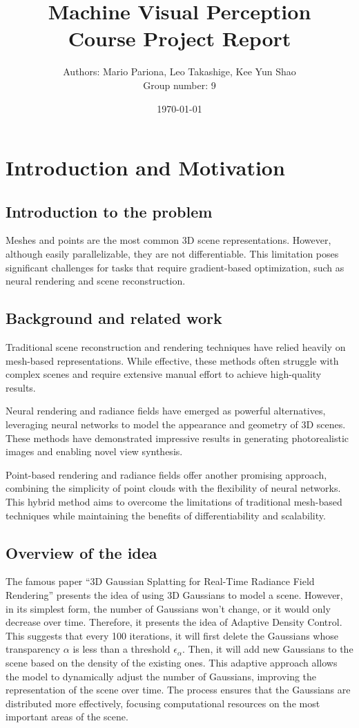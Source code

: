 \documentclass[12pt]{report}
\begin{document}
\title{Machine Visual Perception\\Course Project Report}
\author{Authors: Mario Pariona, Leo Takashige, Kee Yun Shao\\ Group number: 9}
\date{\today}
\maketitle

\chapter{Introduction and Motivation}
\section{Introduction to the problem}
Meshes and points are the most common 3D scene representations. However, although easily parallelizable, they are not differentiable. This limitation poses significant challenges for tasks that require gradient-based optimization, such as neural rendering and scene reconstruction.

\section{Background and related work}
Traditional scene reconstruction and rendering techniques have relied heavily on mesh-based representations. While effective, these methods often struggle with complex scenes and require extensive manual effort to achieve high-quality results.

Neural rendering and radiance fields have emerged as powerful alternatives, leveraging neural networks to model the appearance and geometry of 3D scenes. These methods have demonstrated impressive results in generating photorealistic images and enabling novel view synthesis.

Point-based rendering and radiance fields offer another promising approach, combining the simplicity of point clouds with the flexibility of neural networks. This hybrid method aims to overcome the limitations of traditional mesh-based techniques while maintaining the benefits of differentiability and scalability.

\section{Overview of the idea}
The famous paper “3D Gaussian Splatting for Real-Time Radiance Field Rendering” presents the idea of using 3D Gaussians to model a scene. However, in its simplest form, the number of Gaussians won’t change, or it would only decrease over time. Therefore, it presents the idea of Adaptive Density Control. This suggests that every 100 iterations, it will first delete the Gaussians whose transparency $\alpha$ is less than a threshold $\epsilon_\alpha$.
Then, it will add new Gaussians to the scene based on the density of the existing ones. This adaptive approach allows the model to dynamically adjust the number of Gaussians, improving the representation of the scene over time. The process ensures that the Gaussians are distributed more effectively, focusing computational resources on the most important areas of the scene.
\end{document}

